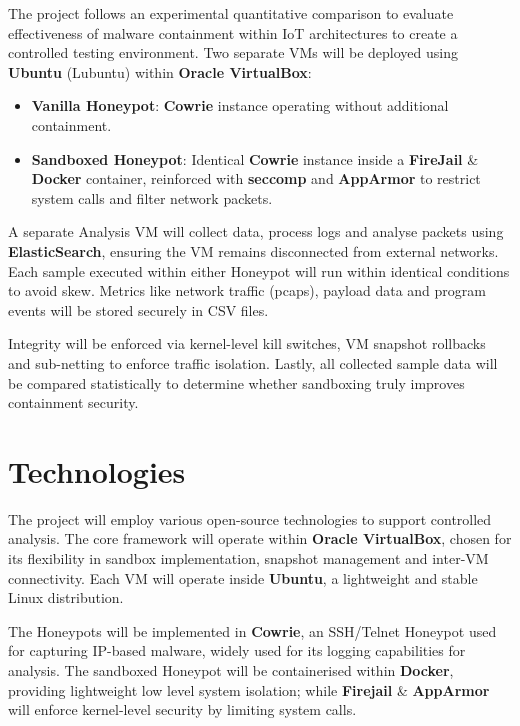\documentclass[a4paper,12pt,oneside]{book}			%
\begin{document}
The project follows an experimental quantitative comparison to evaluate effectiveness of malware containment within IoT architectures to create a controlled testing environment. Two separate VMs will be deployed using \textbf{Ubuntu} (Lubuntu) within \textbf{Oracle VirtualBox}:
\begin{itemize}
\item\textbf{Vanilla Honeypot}: \textbf{Cowrie} instance operating without additional containment.
\item\textbf{Sandboxed Honeypot}: Identical \textbf{Cowrie} instance inside a \textbf{FireJail} \& \textbf{Docker} container, reinforced with \textbf{seccomp} and \textbf{AppArmor} to restrict system calls and filter network packets.
\end{itemize}

A separate Analysis VM will collect data, process logs and analyse packets using \textbf{ElasticSearch}, ensuring the VM remains disconnected from external networks. Each sample executed within either Honeypot will run within identical conditions to avoid skew. Metrics like network traffic (pcaps), payload data and program events will be stored securely in CSV files.

Integrity will be enforced via kernel-level kill switches, VM snapshot rollbacks and sub-netting to enforce traffic isolation. Lastly, all collected sample data will be compared statistically to determine whether sandboxing truly improves containment security. 


\section{Technologies}\label{sec:technologies}

The project will employ various open-source technologies to support controlled analysis. The core framework will operate within \textbf{Oracle VirtualBox}, chosen for its flexibility in sandbox implementation, snapshot management and inter-VM connectivity. Each VM will operate inside \textbf{Ubuntu}, a lightweight and stable Linux distribution.

The Honeypots will be implemented in \textbf{Cowrie}, an SSH/Telnet Honeypot used for capturing IP-based malware, widely used for its logging capabilities for analysis. The sandboxed Honeypot will be containerised within \textbf{Docker}, providing lightweight low level system isolation; while \textbf{Firejail} \& \textbf{AppArmor}  will enforce kernel-level security by limiting system calls.
\end{document}

